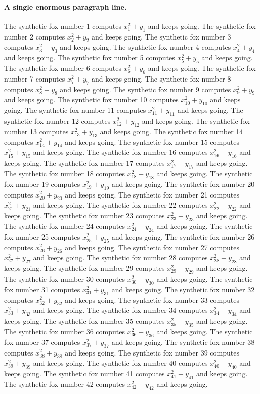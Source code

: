 \documentclass{article}
\begin{document}
\paragraph{A single enormous paragraph line.} The synthetic fox number 1 computes $x_{1}^2 + y_{1}$ and keeps going. The synthetic fox number 2 computes $x_{2}^2 + y_{2}$ and keeps going. The synthetic fox number 3 computes $x_{3}^2 + y_{3}$ and keeps going. The synthetic fox number 4 computes $x_{4}^2 + y_{4}$ and keeps going. The synthetic fox number 5 computes $x_{5}^2 + y_{5}$ and keeps going. The synthetic fox number 6 computes $x_{6}^2 + y_{6}$ and keeps going. The synthetic fox number 7 computes $x_{7}^2 + y_{7}$ and keeps going. The synthetic fox number 8 computes $x_{8}^2 + y_{8}$ and keeps going. The synthetic fox number 9 computes $x_{9}^2 + y_{9}$ and keeps going. The synthetic fox number 10 computes $x_{10}^2 + y_{10}$ and keeps going. The synthetic fox number 11 computes $x_{11}^2 + y_{11}$ and keeps going. The synthetic fox number 12 computes $x_{12}^2 + y_{12}$ and keeps going. The synthetic fox number 13 computes $x_{13}^2 + y_{13}$ and keeps going. The synthetic fox number 14 computes $x_{14}^2 + y_{14}$ and keeps going. The synthetic fox number 15 computes $x_{15}^2 + y_{15}$ and keeps going. The synthetic fox number 16 computes $x_{16}^2 + y_{16}$ and keeps going. The synthetic fox number 17 computes $x_{17}^2 + y_{17}$ and keeps going. The synthetic fox number 18 computes $x_{18}^2 + y_{18}$ and keeps going. The synthetic fox number 19 computes $x_{19}^2 + y_{19}$ and keeps going. The synthetic fox number 20 computes $x_{20}^2 + y_{20}$ and keeps going. The synthetic fox number 21 computes $x_{21}^2 + y_{21}$ and keeps going. The synthetic fox number 22 computes $x_{22}^2 + y_{22}$ and keeps going. The synthetic fox number 23 computes $x_{23}^2 + y_{23}$ and keeps going. The synthetic fox number 24 computes $x_{24}^2 + y_{24}$ and keeps going. The synthetic fox number 25 computes $x_{25}^2 + y_{25}$ and keeps going. The synthetic fox number 26 computes $x_{26}^2 + y_{26}$ and keeps going. The synthetic fox number 27 computes $x_{27}^2 + y_{27}$ and keeps going. The synthetic fox number 28 computes $x_{28}^2 + y_{28}$ and keeps going. The synthetic fox number 29 computes $x_{29}^2 + y_{29}$ and keeps going. The synthetic fox number 30 computes $x_{30}^2 + y_{30}$ and keeps going. The synthetic fox number 31 computes $x_{31}^2 + y_{31}$ and keeps going. The synthetic fox number 32 computes $x_{32}^2 + y_{32}$ and keeps going. The synthetic fox number 33 computes $x_{33}^2 + y_{33}$ and keeps going. The synthetic fox number 34 computes $x_{34}^2 + y_{34}$ and keeps going. The synthetic fox number 35 computes $x_{35}^2 + y_{35}$ and keeps going. The synthetic fox number 36 computes $x_{36}^2 + y_{36}$ and keeps going. The synthetic fox number 37 computes $x_{37}^2 + y_{37}$ and keeps going. The synthetic fox number 38 computes $x_{38}^2 + y_{38}$ and keeps going. The synthetic fox number 39 computes $x_{39}^2 + y_{39}$ and keeps going. The synthetic fox number 40 computes $x_{40}^2 + y_{40}$ and keeps going. The synthetic fox number 41 computes $x_{41}^2 + y_{41}$ and keeps going. The synthetic fox number 42 computes $x_{42}^2 + y_{42}$ and keeps going. 
\end{document}
